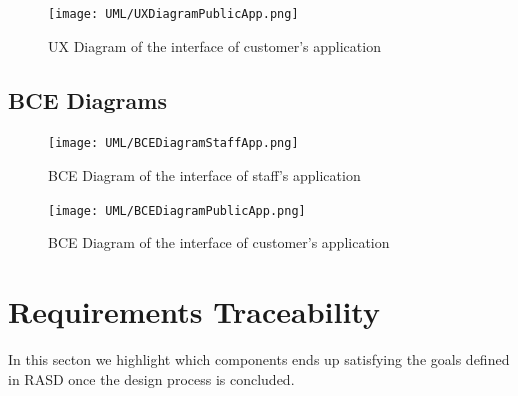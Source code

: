 \documentclass[11pt]{article} %
\begin{document}
\begin{figure}[H]
	\centering
	\texttt{[image: UML/UXDiagramPublicApp.png]}
	\caption{UX Diagram of the interface of customer's application}
\end{figure}

\subsection{BCE Diagrams}

\begin{figure}[H]
	\centering
	\texttt{[image: UML/BCEDiagramStaffApp.png]}
	\caption{BCE Diagram of the interface of staff's application}
\end{figure}	
	
\begin{figure}[H]
	\centering
	\texttt{[image: UML/BCEDiagramPublicApp.png]}
	\caption{BCE Diagram of the interface of customer's application}
\end{figure}	




\newpage
\section{Requirements Traceability}

In this secton we highlight which components ends up satisfying the goals defined in RASD once the design process is concluded.
\end{document}
